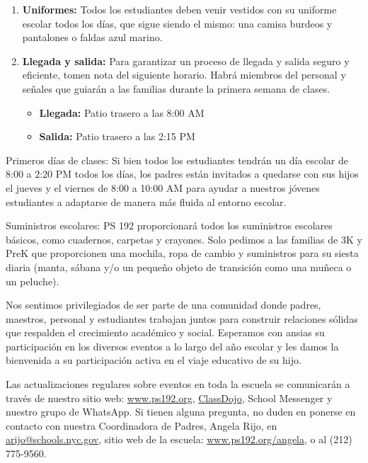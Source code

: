 \documentclass[letterpaper, 12pt]{article}
\begin{document}
\begin{redbox}
\begin{enumerate}
    \item \textbf{Uniformes:} Todos los estudiantes deben venir vestidos con su uniforme escolar todos los días, que sigue siendo el mismo: una camisa burdeos y pantalones o faldas azul marino.
    \item \textbf{Llegada y salida:} Para garantizar un proceso de llegada y salida seguro y eficiente, tomen nota del siguiente horario. Habrá miembros del personal y señales que guiarán a las familias durante la primera semana de clases.
    \begin{itemize}
        \item \textbf{Llegada:} Patio trasero a las 8:00 AM
        \item \textbf{Salida:} Patio trasero a las 2:15 PM
    \end{itemize}
\end{enumerate}
\end{redbox}

Primeros días de clases: Si bien todos los estudiantes tendrán un día escolar de 8:00 a 2:20 PM todos los días, los padres están invitados a quedarse con sus hijos el jueves y el viernes de 8:00 a 10:00 AM para ayudar a nuestros jóvenes estudiantes a adaptarse de manera más fluida al entorno escolar.

Suministros escolares: PS 192 proporcionará todos los suministros escolares básicos, como cuadernos, carpetas y crayones. Solo pedimos a las familias de 3K y PreK que proporcionen una mochila, ropa de cambio y suministros para su siesta diaria (manta, sábana y/o un pequeño objeto de transición como una muñeca o un peluche).

Nos sentimos privilegiados de ser parte de una comunidad donde padres, maestros, personal y estudiantes trabajan juntos para construir relaciones sólidas que respalden el crecimiento académico y social. Esperamos con ansias su participación en los diversos eventos a lo largo del año escolar y les damos la bienvenida a su participación activa en el viaje educativo de su hijo.

\pagebreak
\vspace*{0.4in}

Las actualizaciones regulares sobre eventos en toda la escuela se comunicarán a través de nuestro sitio web: \href{https://www.ps192.org}{www.ps192.org}, \href{https://www.classdojo.com/}{ClassDojo}, School Messenger y nuestro grupo de WhatsApp. Si tienen alguna pregunta, no duden en ponerse en contacto con nuestra Coordinadora de Padres, Angela Rijo, en \href{mailto:arijo@schools.nyc.gov}{arijo@schools.nyc.gov}, sitio web de la escuela: \href{https://www.ps192.org/angela}{www.ps192.org/angela}, o al (212) 775-9560.
\end{document}
